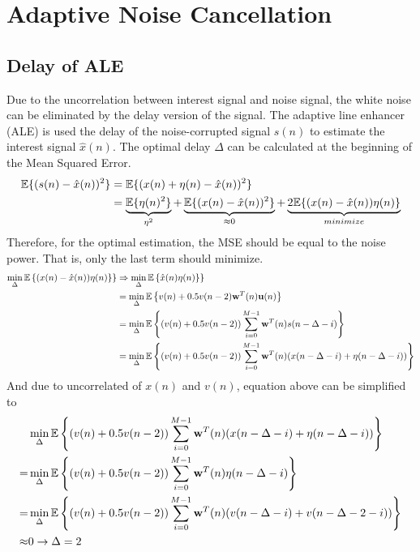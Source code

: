 \allowdisplaybreaks[4]
\section{Adaptive Noise Cancellation}
\subsection{Delay of ALE}
Due to the uncorrelation between interest signal and noise signal, the white noise can be eliminated by the delay version of the signal. The adaptive line enhancer (ALE) is used the delay of the noise-corrupted signal $s(n)$ to estimate the interest signal $\hat x(n)$. The optimal delay $\Delta$ can be calculated at the beginning of the Mean Squared Error.
\begin{align}
	\mathbb{E}\{(s(n)-\hat x(n))^2\}
	&=\mathbb{E}\{(x(n)+\eta(n)-\hat x(n))^2\}\notag\\
	&=\underbrace{\mathbb{E}\{\eta(n)^2\}}_{\eta^2}+\underbrace{\mathbb{E}\{(x(n)-\hat x(n))^2\}}_{\approx 0}+\underbrace{2\mathbb{E}\{(x(n)-\hat x(n))\eta(n)\}}_{minimize}
\end{align}
Therefore, for the optimal estimation, the MSE should be equal to the noise power. That is, only the last term should minimize.
\begin{align}
	\min_{\Delta} \mathbb{E}\left\{(x(n)-\hat x(n))\eta(n)\} \right\}
	&\Rightarrow \min_{\Delta} \mathbb{E}\left\{\hat x(n)\eta(n)\} \right \}\notag\\
	&=\min_{\Delta} \mathbb{E}\left\{v(n) + 0.5v(n-2)\mathbf w^T(n)\mathbf u(n)\right\}\notag\\
	&=\min_{\Delta} \mathbb{E}\left \{(v(n) + 0.5v(n-2))\sum_{i=0}^{M-1}\mathbf w^T(n)s(n-\Delta -i)\right\}\notag\\
	&=\min_{\Delta} \mathbb{E}\left \{(v(n) + 0.5v(n-2))\sum_{i=0}^{M-1}\mathbf w^T(n)(x(n-\Delta -i)+\eta(n-\Delta -i))\right\}
\end{align}
And due to uncorrelated of $x(n)$ and $v(n)$, equation above can be simplified to
\begin{align}
	&\min_{\Delta} \mathbb{E}\left \{(v(n) + 0.5v(n-2))\sum_{i=0}^{M-1}\mathbf w^T(n)(x(n-\Delta -i)+\eta(n-\Delta -i))\right\}\notag\\
	=&\min_{\Delta} \mathbb{E}\left \{(v(n) + 0.5v(n-2))\sum_{i=0}^{M-1}\mathbf w^T(n)\eta(n-\Delta -i)\right\}\notag\\
	=&\min_{\Delta} \mathbb{E}\left \{(v(n) + 0.5v(n-2))\sum_{i=0}^{M-1}\mathbf w^T(n)(v(n-\Delta -i)+v(n-\Delta-2 -i))\right\}\label{eq:MSe}\\
	\approx& 0 \to\Delta=2\notag
\end{align}
